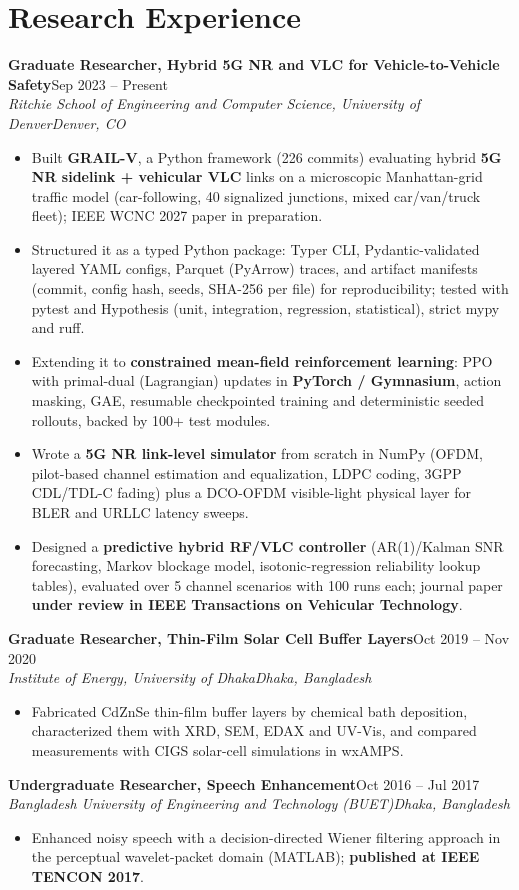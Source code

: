 \documentclass[10pt,letterpaper]{article}
\newcommand{\entry}[4]{\textbf{#1}\hfill #2\\\textit{#3}\hfill\textit{#4}\par}
\begin{document}
\section*{Research Experience}
\entry{Graduate Researcher, Hybrid 5G NR and VLC for Vehicle-to-Vehicle Safety}{Sep 2023 – Present}{Ritchie School of Engineering and Computer Science, University of Denver}{Denver, CO}
\begin{itemize}\item Built \textbf{GRAIL-V}, a Python framework (226 commits) evaluating hybrid \textbf{5G NR sidelink + vehicular VLC} links on a microscopic Manhattan-grid traffic model (car-following, 40 signalized junctions, mixed car/van/truck fleet); IEEE WCNC 2027 paper in preparation.\item Structured it as a typed Python package: Typer CLI, Pydantic-validated layered YAML configs, Parquet (PyArrow) traces, and artifact manifests (commit, config hash, seeds, SHA-256 per file) for reproducibility; tested with pytest and Hypothesis (unit, integration, regression, statistical), strict mypy and ruff.\item Extending it to \textbf{constrained mean-field reinforcement learning}: PPO with primal-dual (Lagrangian) updates in \textbf{PyTorch / Gymnasium}, action masking, GAE, resumable checkpointed training and deterministic seeded rollouts, backed by 100+ test modules.\item Wrote a \textbf{5G NR link-level simulator} from scratch in NumPy (OFDM, pilot-based channel estimation and equalization, LDPC coding, 3GPP CDL/TDL-C fading) plus a DCO-OFDM visible-light physical layer for BLER and URLLC latency sweeps.\item Designed a \textbf{predictive hybrid RF/VLC controller} (AR(1)/Kalman SNR forecasting, Markov blockage model, isotonic-regression reliability lookup tables), evaluated over 5 channel scenarios with 100 runs each; journal paper \textbf{under review in IEEE Transactions on Vehicular Technology}.\end{itemize}
\vspace{2pt}
\entry{Graduate Researcher, Thin-Film Solar Cell Buffer Layers}{Oct 2019 – Nov 2020}{Institute of Energy, University of Dhaka}{Dhaka, Bangladesh}
\begin{itemize}\item Fabricated CdZnSe thin-film buffer layers by chemical bath deposition, characterized them with XRD, SEM, EDAX and UV-Vis, and compared measurements with CIGS solar-cell simulations in wxAMPS.\end{itemize}
\vspace{2pt}
\entry{Undergraduate Researcher, Speech Enhancement}{Oct 2016 – Jul 2017}{Bangladesh University of Engineering and Technology (BUET)}{Dhaka, Bangladesh}
\begin{itemize}\item Enhanced noisy speech with a decision-directed Wiener filtering approach in the perceptual wavelet-packet domain (MATLAB); \textbf{published at IEEE TENCON 2017}.\end{itemize}
\vspace{2pt}
\end{document}
